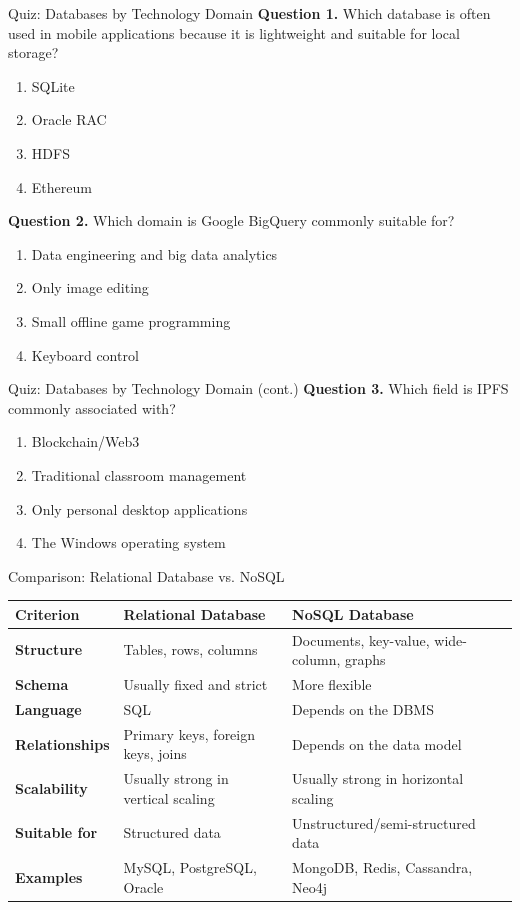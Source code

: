 \documentclass[aspectratio=169,11pt]{beamer}
\newcommand{\tightlist}{\setlength{\itemsep}{2pt}\setlength{\parskip}{0pt}}
\newcommand{\qoption}[2]{\item[#1.] #2}
\begin{document}
\begin{frame}{Quiz: Databases by Technology Domain}
\small
\textbf{Question 1.} Which database is often used in mobile applications because it is lightweight and suitable for local storage?
\begin{enumerate}
\tightlist
  \qoption{A}{SQLite}
  \qoption{B}{Oracle RAC}
  \qoption{C}{HDFS}
  \qoption{D}{Ethereum}
\end{enumerate}

\textbf{Question 2.} Which domain is Google BigQuery commonly suitable for?
\begin{enumerate}
\tightlist
  \qoption{A}{Data engineering and big data analytics}
  \qoption{B}{Only image editing}
  \qoption{C}{Small offline game programming}
  \qoption{D}{Keyboard control}
\end{enumerate}
\end{frame}

\begin{frame}{Quiz: Databases by Technology Domain (cont.)}
\small
\textbf{Question 3.} Which field is IPFS commonly associated with?
\begin{enumerate}
\tightlist
  \qoption{A}{Blockchain/Web3}
  \qoption{B}{Traditional classroom management}
  \qoption{C}{Only personal desktop applications}
  \qoption{D}{The Windows operating system}
\end{enumerate}
\end{frame}

\begin{frame}{Comparison: Relational Database vs. NoSQL}
\scriptsize
\begin{tabularx}{\textwidth}{>{\bfseries}p{} X X}
\toprule
Criterion & Relational Database & NoSQL Database \\
\midrule
Structure & Tables, rows, columns & Documents, key-value, wide-column, graphs \\
Schema & Usually fixed and strict & More flexible \\
Language & SQL & Depends on the DBMS \\
Relationships & Primary keys, foreign keys, joins & Depends on the data model \\
Scalability & Usually strong in vertical scaling & Usually strong in horizontal scaling \\
Suitable for & Structured data & Unstructured/semi-structured data \\
Examples & MySQL, PostgreSQL, Oracle & MongoDB, Redis, Cassandra, Neo4j \\
\bottomrule
\end{tabularx}
\end{frame}
\end{document}
